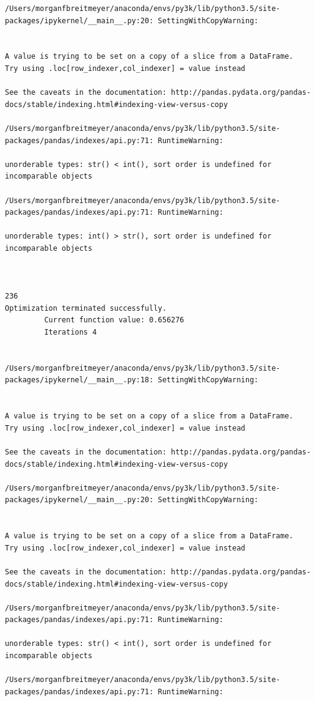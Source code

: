\begin{lstlisting}
/Users/morganfbreitmeyer/anaconda/envs/py3k/lib/python3.5/site-packages/ipykernel/__main__.py:20: SettingWithCopyWarning:


A value is trying to be set on a copy of a slice from a DataFrame.
Try using .loc[row_indexer,col_indexer] = value instead

See the caveats in the documentation: http://pandas.pydata.org/pandas-docs/stable/indexing.html#indexing-view-versus-copy

/Users/morganfbreitmeyer/anaconda/envs/py3k/lib/python3.5/site-packages/pandas/indexes/api.py:71: RuntimeWarning:

unorderable types: str() < int(), sort order is undefined for incomparable objects

/Users/morganfbreitmeyer/anaconda/envs/py3k/lib/python3.5/site-packages/pandas/indexes/api.py:71: RuntimeWarning:

unorderable types: int() > str(), sort order is undefined for incomparable objects



236
Optimization terminated successfully.
         Current function value: 0.656276
         Iterations 4


/Users/morganfbreitmeyer/anaconda/envs/py3k/lib/python3.5/site-packages/ipykernel/__main__.py:18: SettingWithCopyWarning:


A value is trying to be set on a copy of a slice from a DataFrame.
Try using .loc[row_indexer,col_indexer] = value instead

See the caveats in the documentation: http://pandas.pydata.org/pandas-docs/stable/indexing.html#indexing-view-versus-copy

/Users/morganfbreitmeyer/anaconda/envs/py3k/lib/python3.5/site-packages/ipykernel/__main__.py:20: SettingWithCopyWarning:


A value is trying to be set on a copy of a slice from a DataFrame.
Try using .loc[row_indexer,col_indexer] = value instead

See the caveats in the documentation: http://pandas.pydata.org/pandas-docs/stable/indexing.html#indexing-view-versus-copy

/Users/morganfbreitmeyer/anaconda/envs/py3k/lib/python3.5/site-packages/pandas/indexes/api.py:71: RuntimeWarning:

unorderable types: str() < int(), sort order is undefined for incomparable objects

/Users/morganfbreitmeyer/anaconda/envs/py3k/lib/python3.5/site-packages/pandas/indexes/api.py:71: RuntimeWarning:


\end{lstlisting}
